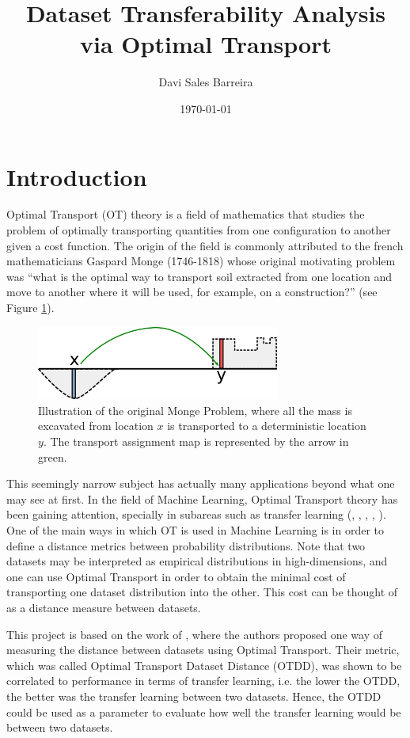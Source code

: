 \documentclass[10pt]{article}
\title{Dataset Transferability Analysis via Optimal Transport}
\author{Davi Sales Barreira}
\date{\today}
\theoremstyle{definition}
\begin{document}
\maketitle

\section{Introduction}

Optimal Transport (OT) theory is a field of mathematics that studies the problem of optimally transporting
quantities from one configuration to another given a cost function.
The origin of the field is commonly attributed to the french mathematicians Gaspard Monge (1746-1818)
whose original motivating problem was
``what is the optimal way to transport soil extracted
from one location and move to another where it will be used,
for example, on a construction?'' (see Figure \ref{fig:mongeproblem}).

\begin{figure}[H]
  \centering
  \includegraphics[width=8cm]{Figures/mongeproblem.png}
  \caption{Illustration of the original Monge Problem, where all the mass is excavated from location
  $x$ is transported to a deterministic location $y$.
  The transport assignment map is represented by the arrow in green.}
  \label{fig:mongeproblem}
\end{figure}

This seemingly narrow subject has actually many applications beyond what one may see at first.
In the field of Machine Learning, Optimal Transport theory has been gaining attention, specially
in subareas such as transfer learning
(\citep{flamary2014optimal}, \citep{courty2014domain},
\citep{damodaran2018deepjdot}, \citep{solomon2014wasserstein},
\citep{shen2018wasserstein}).
One of the main ways in which OT is used in Machine Learning is in order to define
a distance metrics between probability distributions. Note that
two datasets may be interpreted as empirical distributions
in high-dimensions, and one can use Optimal Transport in order to obtain the minimal cost
of transporting one dataset distribution into the other. This cost can be thought of
as a distance measure between datasets.

This project is based on the work of \citet{alvarez2020geometric}, where the
authors proposed one way of measuring the distance between datasets using
Optimal Transport. Their metric, which was called Optimal Transport
Dataset Distance (OTDD), was shown to be correlated to performance in terms of
transfer learning, i.e. the lower the OTDD, the better was the transfer learning
between two datasets. Hence, the OTDD could be
used as a parameter to evaluate how well the transfer learning would be
between two datasets.
\end{document}
